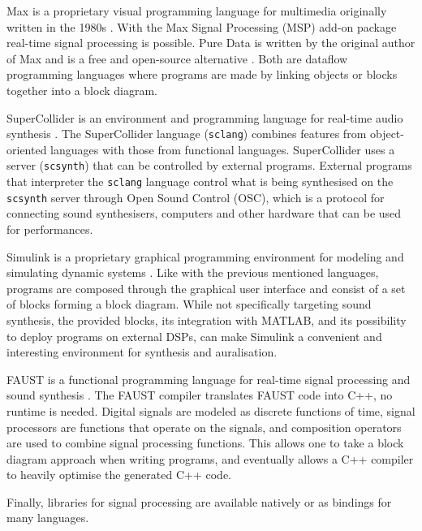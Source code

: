 Max is a proprietary visual programming language for multimedia originally
written in the 1980s \cite{Max2017}. With the Max Signal Processing (MSP) add-on
package real-time signal processing is possible. Pure Data is written by the
original author of Max and is a free and open-source alternative
\cite{PureData2017}. Both are dataflow programming languages where programs are
made by linking objects or blocks together into a block diagram.

SuperCollider is an environment and programming language for real-time audio
synthesis \cite{SuperCollider2017} . The SuperCollider language
(\texttt{sclang}) combines features from object-oriented languages with
those from functional languages. SuperCollider uses a server
(\texttt{scsynth}) that can be controlled by external programs. External
programs that interpreter the \texttt{sclang} language control what is
being synthesised on the \texttt{scsynth} server through Open Sound
Control (OSC), which is a protocol for connecting sound synthesisers, computers
and other hardware that can be used for performances.

Simulink is a proprietary graphical programming environment for modeling and
simulating dynamic systems \cite{Simulink2017}. Like with the previous mentioned
languages, programs are composed through the graphical user interface and
consist of a set of blocks forming a block diagram. While not specifically
targeting sound synthesis, the provided blocks, its integration with MATLAB,
and its possibility to deploy programs on external DSPs, can make Simulink a
convenient and interesting environment for synthesis and auralisation.


FAUST is a functional programming language for real-time signal processing and
sound synthesis \cite{Faust2017}. The FAUST compiler translates FAUST code into
C++, no runtime is needed. Digital signals are modeled as discrete functions of
time, signal processors are functions that operate on the signals, and
composition operators are used to combine signal processing functions.
This allows one to take a block diagram approach when writing programs, and
eventually allows a C++ compiler to heavily optimise the generated C++ code.

Finally, libraries for signal processing are available natively or as bindings
for many languages.




